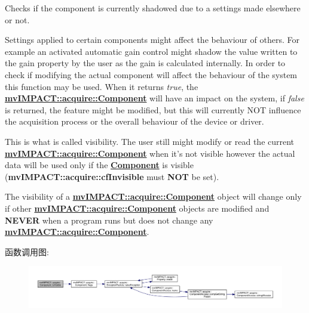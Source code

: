 Checks if the component is currently shadowed due to a settings made elsewhere or not. 

Settings applied to certain components might affect the behaviour of others. For example an activated automatic gain control might shadow the value written to the gain property by the user as the gain is calculated internally. In order to check if modifying the actual component will affect the behaviour of the system this function may be used. When it returns {\itshape true}, the {\bfseries \hyperlink{classmv_i_m_p_a_c_t_1_1acquire_1_1_component}{mv\+I\+M\+P\+A\+C\+T\+::acquire\+::\+Component}} will have an impact on the system, if {\itshape false} is returned, the feature might be modified, but this will currently N\+O\+T influence the acquisition process or the overall behaviour of the device or driver.

This is what is called visibility. The user still might modify or read the current {\bfseries \hyperlink{classmv_i_m_p_a_c_t_1_1acquire_1_1_component}{mv\+I\+M\+P\+A\+C\+T\+::acquire\+::\+Component}} when it's not visible however the actual data will be used only if the {\bfseries \hyperlink{classmv_i_m_p_a_c_t_1_1acquire_1_1_component}{Component}} is visible ({\bfseries mv\+I\+M\+P\+A\+C\+T\+::acquire\+::cf\+Invisible} must {\bfseries N\+O\+T} be set).

The visibility of a {\bfseries \hyperlink{classmv_i_m_p_a_c_t_1_1acquire_1_1_component}{mv\+I\+M\+P\+A\+C\+T\+::acquire\+::\+Component}} object will change only if other {\bfseries \hyperlink{classmv_i_m_p_a_c_t_1_1acquire_1_1_component}{mv\+I\+M\+P\+A\+C\+T\+::acquire\+::\+Component}} objects are modified and {\bfseries N\+E\+V\+E\+R} when a program runs but does not change any {\bfseries \hyperlink{classmv_i_m_p_a_c_t_1_1acquire_1_1_component}{mv\+I\+M\+P\+A\+C\+T\+::acquire\+::\+Component}}. 

函数调用图\+:
\nopagebreak
\begin{figure}[H]
\begin{center}
\leavevmode
\includegraphics[width=350pt]{classmv_i_m_p_a_c_t_1_1acquire_1_1_component_ae9f95ac45440af06f7d36990ad633a73_cgraph}
\end{center}
\end{figure}


